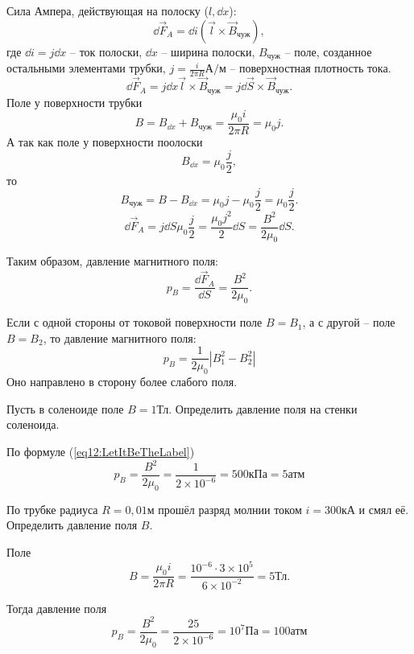     Сила Ампера, действующая на полоску (\( l, \dd x \)):
    \[
        \dd \vec{F}_A = \dd i(\vec{l}\times\vec{B}_{\textit{чуж}}),
    \]
    где \( \dd i = j\dd x \) -- ток полоски, \( \dd x \) -- ширина полоски,
    \( B_{\textit{чуж}} \) -- поле, созданное остальными элементами трубки,
    \( j = \frac{i}{2\pi R}\text{А}/\text{м} \) -- поверхностная плотность тока.
    \[
        \dd \vec{F}_A = j\dd x\vec{l}\times\vec{B}_{\textit{чуж}} =
        j\dd \vec{S}\times\vec{B}_{\textit{чуж}}.
    \]
    Поле у поверхности трубки
    \[
        B = B_{\dd x} + B_{\textit{чуж}} = \frac{\mu_0i}{2\pi R} = \mu_0j.
    \]
    А так как поле у поверхности поолоски
    \[ 
        B_{\dd x} = \mu_0\frac{j}{2},
    \]
    то
    \[
        B_{\textit{чуж}} = B - B_{\dd x} = \mu_0j - \mu_0\frac{j}{2} =
        \mu_0\frac{j}{2}.
    \]
    \[
        \dd \vec{F}_A = j\dd S\mu_0\frac{j}{2} = \frac{\mu_0j^2}{2}\dd S =
        \frac{B^2}{2\mu_0}\dd S.
    \]
    
    Таким образом, давление магнитного поля:
    \begin{equation}
        p_B = \frac{\dd \vec{F}_A}{\dd S} = \frac{B^2}{2\mu_0}.
        \label{eq12:LetItBeTheLabel}
    \end{equation}
    
    \begin{remark}
        Если с одной стороны от токовой поверхности поле \( B = B_1 \),
        а с другой -- поле \( B = B_2 \), то давление магнитного поля:
        \begin{equation}
            p_B = \frac{1}{2\mu_0}|B_1^2 - B_2^2|
        \end{equation}
        Оно направлено в сторону более слабого поля.
    \end{remark}
    
    \begin{example}
        Пусть в соленоиде поле \( B = 1 \)Тл. Определить давление поля на стенки
        соленоида.
    \end{example}
    
    \begin{solution}
        По формуле (\ref{eq12:LetItBeTheLabel})
        \[
            p_B = \frac{B^2}{2\mu_0} = \frac{1}{2\times10^{-6}} = 500 \text{кПа}
            = 5 \text{атм}
        \]
    \end{solution}
    
    \begin{example}
        По трубке радиуса \( R = 0,01 \)м прошёл разряд молнии током
        \( i = 300 \)кА и смял её. Определить давление поля \( B \).
    \end{example}
    
    \begin{solution}
        Поле
        \[
            B = \frac{\mu_0i}{2\pi R} = 
            \frac{10^{-6}\cdot3\times10^5}{6\times10^{-2}} = 5\text{Тл}.
        \]
        
        Тогда давление поля
        \[
            p_B = \frac{B^2}{2\mu_0} = \frac{25}{2\times10^{-6}} =
            10^7 \text{Па} = 100 \text{атм} 
        \]
    \end{solution}
